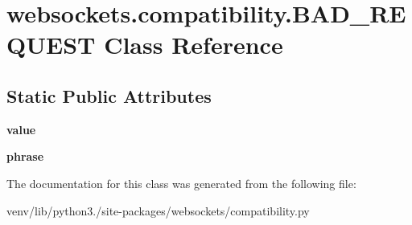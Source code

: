 \hypertarget{classwebsockets_1_1compatibility_1_1_b_a_d___r_e_q_u_e_s_t}{}\section{websockets.\+compatibility.\+B\+A\+D\+\_\+\+R\+E\+Q\+U\+E\+ST Class Reference}
\label{classwebsockets_1_1compatibility_1_1_b_a_d___r_e_q_u_e_s_t}
\subsection*{Static Public Attributes}
\begin{DoxyCompactItemize}
\item 
\mbox{\label{classwebsockets_1_1compatibility_1_1_b_a_d___r_e_q_u_e_s_t_a2d2e36610e92890977dd57400af8b3c8}} 
{\bfseries value}
\item 
\mbox{\label{classwebsockets_1_1compatibility_1_1_b_a_d___r_e_q_u_e_s_t_a801cbafb843d6c3bcc12e456c4e0c774}} 
{\bfseries phrase}
\end{DoxyCompactItemize}


The documentation for this class was generated from the following file\+:\begin{DoxyCompactItemize}
\item 
venv/lib/python3./site-\/packages/websockets/compatibility.\+py\end{DoxyCompactItemize}
